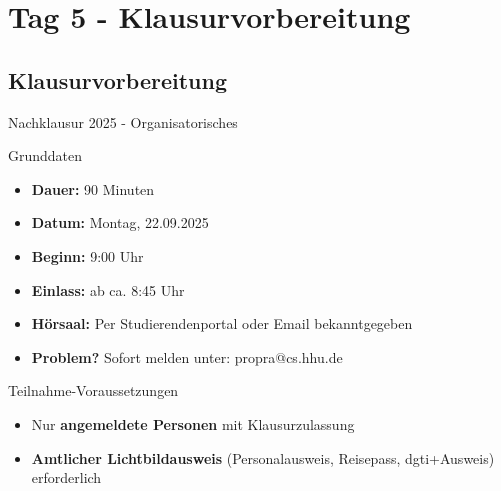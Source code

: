 \section{Tag 5 - Klausurvorbereitung}

\subsection{Klausurvorbereitung}

\begin{frame}{Nachklausur 2025 - Organisatorisches}
  \begin{exampleblock}{Grunddaten}
    \begin{itemize}
      \item \textbf{Dauer:} 90 Minuten
      \item \textbf{Datum:} Montag, 22.09.2025
      \item \textbf{Beginn:} 9:00 Uhr
      \item \textbf{Einlass:} ab ca. 8:45 Uhr
      \item \textbf{Hörsaal:} Per Studierendenportal oder Email bekanntgegeben
      \item \textbf{Problem?} Sofort melden unter: propra@cs.hhu.de
    \end{itemize}
  \end{exampleblock}

  \begin{alertblock}{Teilnahme-Voraussetzungen}
    \begin{itemize}
      \item Nur \textbf{angemeldete Personen} mit Klausurzulassung
      \item \textbf{Amtlicher Lichtbildausweis} (Personalausweis, Reisepass, dgti+Ausweis) erforderlich
    \end{itemize}
  \end{alertblock}
\end{frame}

